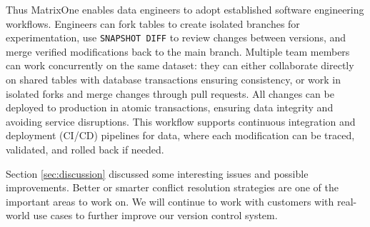 \documentclass[sigconf,nonacm]{acmart} %
\begin{document}
Thus MatrixOne enables data engineers to adopt established software engineering 
workflows. Engineers can fork tables to create isolated branches for 
experimentation, use \texttt{SNAPSHOT DIFF} to review changes between versions, 
and merge verified modifications back to the main branch. Multiple team members 
can work concurrently on the same dataset: they can either collaborate directly 
on shared tables with database transactions ensuring consistency, or work in 
isolated forks and merge changes through pull requests. All changes can be 
deployed to production in atomic transactions, ensuring data integrity and 
avoiding service disruptions. This workflow supports continuous integration 
and deployment (CI/CD) pipelines for data, where each modification can be 
traced, validated, and rolled back if needed.
 
Section \ref{sec:discussion} discussed some interesting issues 
and possible improvements.  Better or smarter conflict 
resolution strategies are one of the important areas to work on.
We will continue to work with customers with real-world use 
cases to further improve our version control system.  


\renewcommand\bibname{References}


\end{document}
